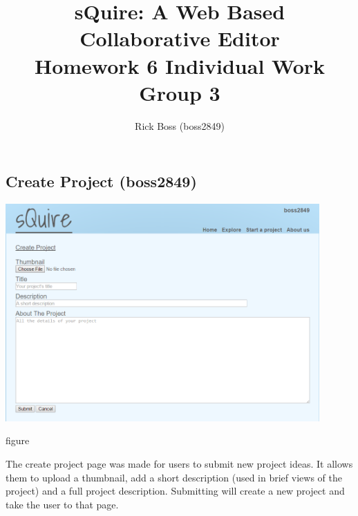 \documentclass[11pt]{article}
\title{sQuire: A Web Based Collaborative Editor\\Homework 6 Individual Work\\Group 3}
\author{Rick Boss (boss2849)}
\begin{document}
\maketitle

\subsection{Create Project (boss2849)}
\begin{minipage}{1\textwidth}
    \begin{center}
    \includegraphics[width=0.9\textwidth]{protos/proto-createproject-boss2849}
    \end{center}
    \caption{figure}{The create project page was made for users to submit new project ideas. It allows them to upload a thumbnail, add a short description (used in brief views of the project) and a full project description. Submitting will create a new project and take the user to that page.}
\end{minipage}
\end{document}
